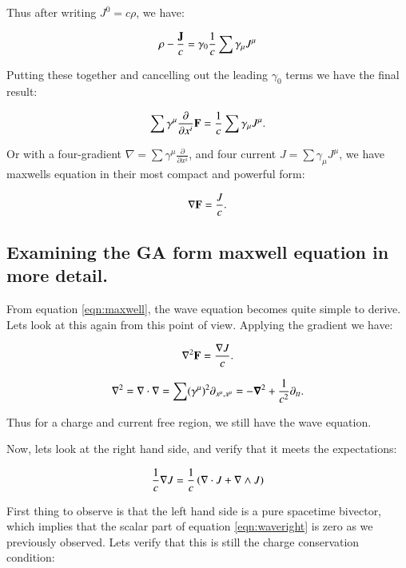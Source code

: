 \documentclass{article}
\newcommand{\spacegrad}[0]{\boldsymbol{\nabla}}
\newcommand{\grad}[0]{\nabla}
\begin{document}
Thus after writing $J^0 = c \rho$, we have:

\begin{equation*}
\rho - \frac{\mathbf{J}}{c} = \gamma_0 \frac{1}{c} \sum \gamma_{\mu} J^{\mu}
\end{equation*}

Putting these together and cancelling out the leading $\gamma_0$ terms we have the final result:

\begin{equation}
\sum \gamma^{\mu} \frac{\partial}{\partial x^i} \mathbf{F} = \frac{1}{c} \sum \gamma_{\mu} J^{\mu}.
\end{equation}

Or with a four-gradient $\grad = \sum \gamma^{\mu} \frac{\partial}{\partial x^i}$, and four current $J = \sum \gamma_{\mu} J^{\mu}$, we have maxwells equation in their most compact and powerful form:

\begin{equation}\label{eqn:maxwell}
\grad \BF = \frac{J}{c}.
\end{equation}

\subsection{ Examining the GA form maxwell equation in more detail. }

From equation \ref{eqn:maxwell}, the wave equation becomes quite simple to derive.  Lets look at this again from this point of
view.  Applying the gradient we have:

\begin{equation}
\grad^2 \BF = \frac{\grad J}{c}.
\end{equation}

\begin{equation}
\grad^2 = \grad \cdot \grad = \sum (\gamma^{\mu})^2 \partial_{x^{\mu},x^{\mu}} = -\spacegrad^2 + \inv{c^2}\partial_{tt}.
\end{equation}

Thus for a charge and current free region, we still have the wave equation.

Now, lets look at the right hand side, and verify that it meets the expectations:

\begin{equation}\label{eqn:waveright}
\inv{c}\grad J = \inv{c}\left(\grad \cdot J + \grad \wedge J\right)
\end{equation}

First thing to observe is that the left hand side is a pure spacetime bivector, which implies that the scalar part of 
equation \ref{eqn:waveright} is zero as we previously observed.  Lets verify that this is still the charge conservation
condition:
\end{document}
